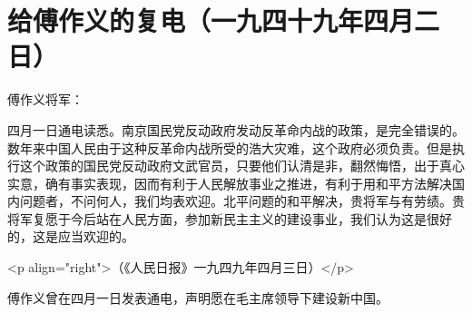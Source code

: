 \section[给傅作义的复电（一九四十九年四月二日）]{给傅作义的复电（一九四十九年四月二日）}


傅作义将军：

四月一日通电读悉。南京国民党反动政府发动反革命内战的政策，是完全错误的。数年来中国人民由于这种反革命内战所受的浩大灾难，这个政府必须负责。但是执行这个政策的国民党反动政府文武官员，只要他们认清是非，翻然悔悟，出于真心实意，确有事实表现，因而有利于人民解放事业之推进，有利于用和平方法解决国内问题者，不问何人，我们均表欢迎。北平问题的和平解决，贵将军与有劳绩。贵将军复愿于今后站在人民方面，参加新民主主义的建设事业，我们认为这是很好的，这是应当欢迎的。

<p align="right">（《人民日报》一九四九年四月三日）</p>

傅作义曾在四月一日发表通电，声明愿在毛主席领导下建设新中国。

